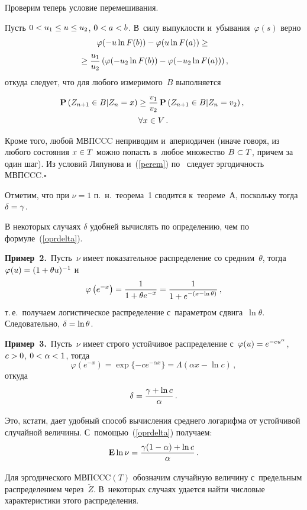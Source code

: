 \begin{multicols}{2}
Проверим теперь условие перемешивания.

Пусть $0<u_1\hm\le u\hm\le u_2$, $0\hm<a\hm<b$. В~силу вы\-пук\-лости и~убывания~$\varphi(s)$ верно
\begin{multline*}
\varphi(-u\ln F(b))-\varphi(u\ln F(a))\ge{}\\
{}\ge\displaystyle\frac{\displaystyle u_1\mathstrut}{\displaystyle u_2\mathstrut}
\left(\varphi(-u_2\ln F(b))-\varphi(-u_2\ln F(a))\right),
\end{multline*}
откуда следует, что для любого измеримого~$B$ выполняется
\begin{multline}
\label{perem}
\!\!{\bf P}\left(Z_{n+1}\in B|Z_n=x\right)\ge\displaystyle\frac{\displaystyle v_1\mathstrut}{\displaystyle v_2\mathstrut}\,{\bf P}
\left(Z_{n+1}\in B|Z_n=v_2\right),
\\
 \forall x\in V\,.
\end{multline}

Кроме того, любой МВПCCC неприводим и~апериодичен (иначе говоря,
из любого со\-сто\-яния $x\hm\in T$ можно по\-пасть в~любое множество
$B\hm\subset T$, причем за один шаг).
Из условий Ляпунова и~(\ref{perem}) по~\cite[\S~2, тео\-ре\-ма~2]{Borov} следует
эр\-го\-дич\-ность \mbox{МВПCCC}.\hfill$\square$


Отметим, что при $\nu=1$ п.~н.\  тео\-ре\-ма~1 сводится к~тео\-ре\-ме~А, 
поскольку тогда $\delta\hm=\gamma$.

В некоторых случаях $\delta$ удобней вы\-чис\-лять по определению, чем 
по формуле~(\ref{oprdelta}).

\smallskip

\noindent
\textbf{Пример~2.}\ Пусть~$\nu$ имеет показательное распределение со средним~$\theta$, тогда
$\varphi(u)\hm=(1\hm+\theta u)^{-1}$ и~$$
\varphi \left(e^{-x}\right)=\displaystyle\frac{\displaystyle 1\mathstrut}{\displaystyle 1+\theta e^{-x}\mathstrut}=\displaystyle\frac{\displaystyle 1\mathstrut}{\displaystyle 1+e^{-(x-\ln\theta)}\mathstrut}\,,
$$
т.\,е.\ получаем логистическое распределение с~па\-ра\-мет\-ром сдвига~$\ln\theta$. 
Следовательно,
$\delta\hm=\ln\theta$.

\smallskip

\noindent
\textbf{Пример~3.}\ Пусть~$\nu$ имеет строго устойчивое распределение 
с~$\varphi(u)\hm=e^{-cu^\alpha}$,
$c\hm>0$, $0\hm<\alpha\hm<1$, тогда
$$
\varphi\left(e^{-x}\right)=\exp\{-ce^{-\alpha x}\}=\Lambda(\alpha x-\ln c)\,,
$$
откуда
$$
\delta=\displaystyle\frac{\displaystyle \gamma+\ln c\mathstrut}{\displaystyle \alpha\mathstrut}\,.
$$

Это, кстати, дает удобный способ вы\-чис\-ле\-ния сред\-не\-го логарифма от
устойчивой случайной величины. С~по\-мощью~(\ref{oprdelta}) получаем:
$$
{\bf E}\ln\nu=\displaystyle\frac{\displaystyle \gamma(1-\alpha)+\ln c\mathstrut}{\displaystyle \alpha\mathstrut}\,.
$$

Для эргодического $\mathrm{МВПCCC}(T)$
обозначим случайную величину с~предельным распределением через~${\tilde Z}$.
В~некоторых случаях удается найти чис\-ло\-вые характеристики этого рас\-пре\-де\-ления.


\end{multicols}
